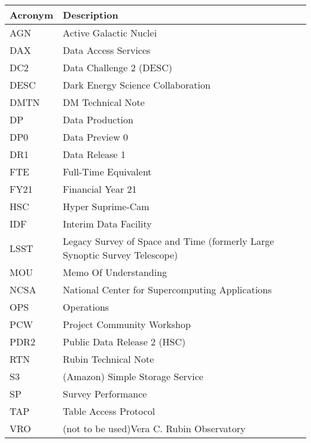 \addtocounter{table}{-1}
\begin{longtable}{p{}p{}}\hline
\textbf{Acronym} & \textbf{Description}  \\\hline

AGN & Active Galactic Nuclei \\\hline
DAX & Data Access Services \\\hline
DC2 & Data Challenge 2 (DESC) \\\hline
DESC & Dark Energy Science Collaboration \\\hline
DMTN & DM Technical Note \\\hline
DP & Data Production \\\hline
DP0 & Data Preview 0 \\\hline
DR1 & Data Release 1 \\\hline
FTE & Full-Time Equivalent \\\hline
FY21 & Financial Year 21 \\\hline
HSC & Hyper Suprime-Cam \\\hline
IDF & Interim Data Facility \\\hline
LSST & Legacy Survey of Space and Time (formerly Large Synoptic Survey Telescope) \\\hline
MOU & Memo Of Understanding \\\hline
NCSA & National Center for Supercomputing Applications \\\hline
OPS & Operations \\\hline
PCW & Project Community Workshop \\\hline
PDR2 & Public Data Release 2 (HSC) \\\hline
RTN & Rubin Technical Note \\\hline
S3 & (Amazon) Simple Storage Service  \\\hline
SP & Survey Performance \\\hline
TAP & Table Access Protocol \\\hline
VRO & (not to be used)Vera C. Rubin Observatory \\\hline
\end{longtable}
